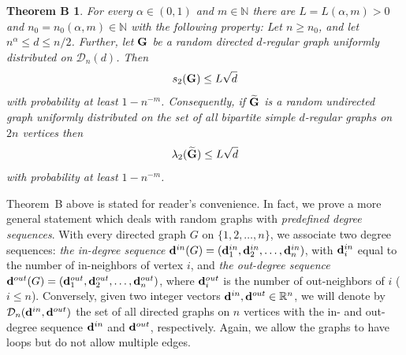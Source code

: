 \documentclass[12pt]{article}
\newtheorem*{theoremB*}{Theorem B}
\theoremstyle{definition}
\theoremstyle{plain}
\newcommand{\N}{\mathbb{N}}
\newcommand{\R}{\mathbb{R}}
\def\nrangr{G}
\def\rangr{{\bf{}G}}
\def\InDeg{{\bf d}^{in}}
\def\OutDeg{{\bf d}^{out}}
\def\DGraphSet{{\mathcal D}_n}
\begin{document}
\begin{theoremB*}
For every $\alpha\in(0,1)$ and $m\in\N$ there are
$L=L(\alpha,m)>0$ and $n_0=n_0(\alpha,m)\in\N$ with the following property:
Let $n\geq n_0$,
and let $n^\alpha\leq d\leq n/2$.
Further, 
let $\rangr$ be a random directed $d$-regular graph uniformly distributed on
$\DGraphSet(d)$. Then
$$s_2(\rangr)\leq L\sqrt{d}$$
with probability at least $1-n^{-m}$. 
Consequently, if $\widetilde \rangr$ is a random undirected graph uniformly distributed on the set of all bipartite simple
$d$-regular graphs on $2n$ vertices then
$$\lambda_2(\widetilde\rangr)\leq L\sqrt{d}$$
with probability at least $1-n^{-m}$.
\end{theoremB*}

\bigskip

Theorem~B above is stated for reader's convenience.
In fact, we prove a more general statement which deals with random graphs
with {\it predefined degree sequences}.
With every directed graph $\nrangr$ on $\{1,2,\ldots,n\}$, we associate two degree sequences:
{\it the in-degree sequence $\InDeg(\nrangr)=(\InDeg_1,\InDeg_2,\ldots,\InDeg_n)$}, with $\InDeg_i$
equal to the number of in-neighbors of vertex $i$, and
{\it the out-degree sequence $\OutDeg(\nrangr)=(\OutDeg_1,\OutDeg_2,\ldots,\OutDeg_n)$},
where $\OutDeg_i$ is the number of out-neighbors of $i$ ($i\leq n$).
Conversely, given two integer vectors $\InDeg, \OutDeg\in\R^n$, we will denote by $\DGraphSet(\InDeg, \OutDeg)$
the set of all directed graphs on $n$ vertices with the in- and out-degree sequence $\InDeg$ and $\OutDeg$,
respectively. Again, we allow the graphs to have loops but do not allow multiple edges.
\end{document}

